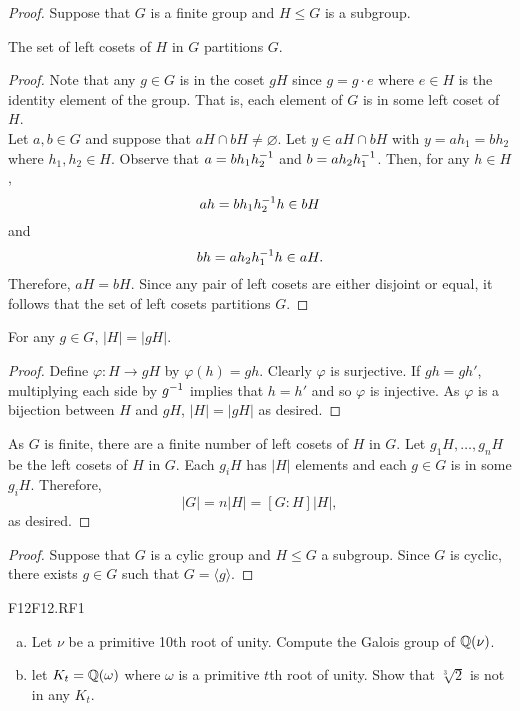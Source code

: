 \documentclass[../AlgebraQualSolutions.tex]{subfiles}
\begin{document}
	\begin{proof}
		Suppose that $G$ is a finite group and $H \leq G$ is a subgroup.

		\begin{claim}
			The set of left cosets of $H$ in $G$ partitions $G$.

			\begin{proof}
				Note that any $g \in G$ is in the coset $gH$ since $g = g\cdot e$ where $e \in H$ is the identity element of the group. That is, each element of $G$ is in some left coset of $H$.\\

				Let $a,b \in G$ and suppose that $aH \cap bH \neq \varnothing$. Let $y \in aH \cap bH$ with $y = ah_1 = bh_2$ where $h_1,h_2 \in H$. Observe that $a = bh_1h_2^{-1}$ and $b = ah_2h_1^{-1}$. Then, for any $h \in H$,
					\[ah = bh_1h_2^{-1} h \in bH \]
				and
					\[bh = ah_2h_1^{-1} h \in aH.\]
				Therefore, $aH = bH$. Since any pair of left cosets are either disjoint or equal, it follows that the set of left cosets partitions $G$.
			\end{proof}
		\end{claim}

		\begin{claim}
			For any $g \in G$, $|H| = |gH|$.

			\begin{proof}
				Define $\varphi: H \to gH$ by $\varphi(h) = gh$. Clearly $\varphi$ is surjective. If $gh = gh'$, multiplying each side by $g^{-1}$ implies that $h = h'$ and so $\varphi$ is injective. As $\varphi$ is a bijection between $H$ and $gH$, $|H| = |gH|$ as desired. 
			\end{proof}
		\end{claim}

		As $G$ is finite, there are a finite number of left cosets of $H$ in $G$. Let $g_1H, \ldots, g_nH$ be the left cosets of $H$ in $G$. Each $g_iH$ has $|H|$ elements and each $g \in G$ is in some $g_iH$. Therefore,
			\[|G| = n|H| = [G:H]|H|,\]
		as desired.
	\end{proof}

	\begin{proof}
		Suppose that $G$ is a cylic group and $H \leq G$ a subgroup. Since $G$ is cyclic, there exists $g \in G$ such that $G = \langle g \rangle$. 
	\end{proof}
	
	\begin{prob}{F12}{F12.RF1}
	\begin{enumerate}[(a)]
	\item Let $\nu$ be a primitive 10th root of unity. Compute the Galois group of $\mathbb{Q}(\nu)$.
	\item let $K_t = \mathbb{Q}(\omega)$ where $\omega$ is a primitive $t$th root of unity. Show that $\sqrt[3]{2}$ is not in any $K_t$.
	\end{enumerate}
	\end{prob}
	
\end{document}
